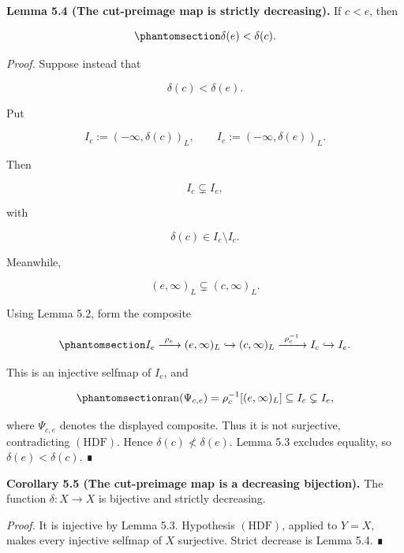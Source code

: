 \documentclass[
  english,
  11pt,
  reqno]{amsart}
\begin{document}
\protect{}\label{lem:5-4-delta-decreasing}

\textbf{Lemma 5.4 (The cut-preimage map is strictly decreasing).} If
\(c<e\), then

\begin{equation}\protect\phantomsection\label{eq:delta-decreasing}{
\delta(e)<\delta(c).
}\end{equation}

\emph{Proof.} Suppose instead that

\[
\delta(c)<\delta(e).
\]

Put

\[
I_c:=(-\infty,\delta(c))_L,
\qquad
I_e:=(-\infty,\delta(e))_L.
\]

Then

\[
I_c\subsetneq I_e,
\]

with

\[
\delta(c)\in I_e\setminus I_c.
\]

Meanwhile,

\[
(e,\infty)_L
\subsetneq
(c,\infty)_L.
\]

Using Lemma 5.2, form the composite

\begin{equation}\protect\phantomsection\label{eq:proper-ray-selfmap}{
I_e
\xrightarrow{\ \rho_e\ }
(e,\infty)_L
\hookrightarrow
(c,\infty)_L
\xrightarrow{\ \rho_c^{-1}\ }
I_c
\hookrightarrow
I_e.
}\end{equation}

This is an injective selfmap of \(I_e\), and

\begin{equation}\protect\phantomsection\label{eq:proper-ray-selfmap-range}{
\operatorname{ran}(\Psi_{c,e})
=
\rho_c^{-1}[(e,\infty)_L]
\subseteq
I_c
\subsetneq
I_e,
}\end{equation}

where \(\Psi_{c,e}\) denotes the displayed composite. Thus it is not
surjective, contradicting \((\mathrm{HDF})\). Hence
\(\delta(c)\not<\delta(e)\). Lemma 5.3 excludes equality, so
\(\delta(e)<\delta(c)\). ∎

\protect{}\label{cor:5-5-delta-bijective}

\textbf{Corollary 5.5 (The cut-preimage map is a decreasing bijection).}
The function \(\delta:X\to X\) is bijective and strictly decreasing.

\emph{Proof.} It is injective by Lemma 5.3. Hypothesis
\((\mathrm{HDF})\), applied to \(Y=X\), makes every injective selfmap of
\(X\) surjective. Strict decrease is Lemma 5.4. ∎
\end{document}
